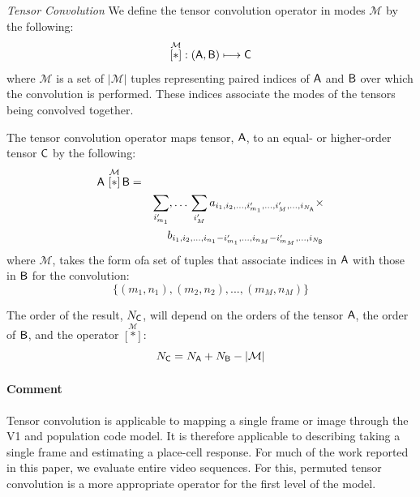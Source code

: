 \begin{definition}{\it Tensor Convolution} We define the tensor convolution operator in modes $\mathcal{M}$ by the following:
\[
 \overset{\mathcal{M}}{[ \ast ]}: \left (\mathsf{A},\mathsf{B}  \right ) \longmapsto \mathsf{C}
\] 
 where $\mathcal{M}$ is a set of $|\mathcal{M}|$ tuples representing paired indices of $\mathsf{A}$ and $\mathsf{B}$ over which the convolution is performed.   These indices associate the modes of the tensors being convolved together.

The tensor convolution operator maps tensor, $\mathsf{A}$, to an equal- or higher-order tensor $\mathsf{C}$ by the following:
\begin{eqnarray}
\mathsf{A} \,\, \overset{\mathcal{M}}{[ \ast ]}\, {\mathsf{B}} &=& \nonumber \\
& &\sum_{i'_{m_1}},\ldots\,\sum_{i_{M}'}   a_{i_1,i_2,...,i_{m_1}',...,i_{M}',...,i_{N_{\mathsf{A}}}} \times \nonumber \\
& &b_{i_1,i_2,...,i_{n_1}-i_{m_1}',...,i_{n_M}-i_{m_M}',...,i_{N_{\mathsf{B}}}}
\label{eq:t1}
\end{eqnarray}
where $\mathcal{M}$, takes the form ofa set of tuples that associate indices in $\mathsf{A}$ with those in $\mathsf{B}$ for the convolution:
\[
\lbrace(m_1,n_1),(m_2,n_2),...,(m_{M},n_{M})\rbrace
\]

The order of the result, $N_{\mathsf{C}}$, will depend on the orders of the tensor $\mathsf{A}$, the order of $\mathsf{B}$, and the operator  $\overset{\mathcal{M}}{[ \ast ]}$:
\[
N_{\mathsf{C}} = N_{\mathsf{A}}+N_{\mathsf{B}}-|\mathcal{M}|
\]
\end{definition}

\paragraph{Comment}  Tensor convolution is applicable to mapping a single frame or image through the V1 and population code model.  It is therefore applicable to describing taking a single frame and estimating a place-cell response.  For much of the work reported in this paper, we evaluate entire video sequences. For this, permuted tensor convolution is a more appropriate operator for the first level of the model.

